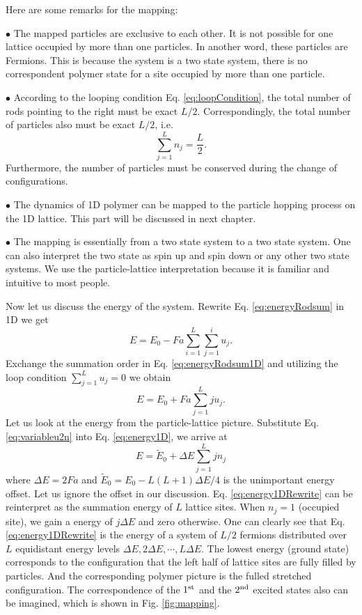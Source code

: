 Here are some remarks for the mapping:

$\bullet$ The mapped particles are exclusive to each other. It is not possible for one lattice occupied by more than one particles. In another word, these particles are Fermions. This is because the system is a two state system, there is no correspondent polymer state for a site occupied by more than one particle.

$\bullet$ According to the looping condition Eq. \eqref{eq:loopCondition}, the total number of rods pointing to the right must be exact $L/2$. Correspondingly, the total number of particles also must be exact $L/2$, i.e.
\begin{equation}
    \label{eq:loopConditionParticle}
    \sum_{j=1}^{L}{n_j} = \frac{L}{2}.
\end{equation}
Furthermore, the number of particles must be conserved during the change of configurations.

$\bullet$ The dynamics of 1D polymer can be mapped to the particle hopping process on the 1D lattice. This part will be discussed in next chapter.

$\bullet$ The mapping is essentially from a two state system to a two state system. One can also interpret the two state as spin up and spin down or any other two state systems. We use the particle-lattice interpretation because it is familiar and intuitive to most people. 

Now let us discuss the energy of the system. Rewrite Eq. \eqref{eq:energyRodsum} in 1D we get
\begin{equation}
    \label{eq:energyRodsum1D}
    E = E_0 - Fa \sum_{i=1}^L\sum_{j=1}^i u_j.
\end{equation}
Exchange the summation order in Eq. \eqref{eq:energyRodsum1D} and utilizing the loop condition $\sum_{j=1}^L u_j = 0$ we obtain
\begin{equation}
    \label{eq:energy1D}
    E = E_0 + Fa \sum_{j=1}^L j u_j.
\end{equation}
Let us look at the energy from the particle-lattice picture. Substitute Eq. \eqref{eq:variableu2n} into Eq. \eqref{eq:energy1D}, we arrive at
\begin{equation}
    \label{eq:energy1DRewrite}
    E = \tilde{E}_0+\Delta E\sum_{j=1}^{L} j n_j 
\end{equation}
where $\Delta E = 2Fa$ and $\tilde{E}_0 = E_0 - L(L+1)\Delta E/4$ is the unimportant energy offset. Let us ignore the offset in our discussion. Eq. \eqref{eq:energy1DRewrite} can be reinterpret as the summation energy of $L$ lattice sites. When $n_j = 1$ (occupied site), we gain a energy of $j\Delta E$ and zero otherwise. One can clearly see that Eq. \eqref{eq:energy1DRewrite} is the energy of a system of $L/2$ fermions distributed over $L$ equidistant energy levels $\Delta E, 2\Delta E, \cdots, L\Delta E$.
The lowest energy (ground state) corresponds to the configuration that the left half of lattice sites are fully filled by particles. And the corresponding polymer picture is the fulled stretched configuration. The correspondence of the $1^{\rm{st}}$ and the $2^{\rm{nd}}$ excited states also can be imagined, which is shown in Fig. \ref{fig:mapping}. 

